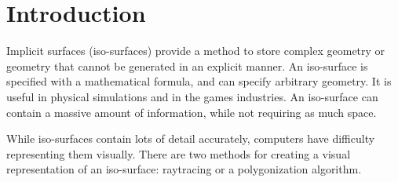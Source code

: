 \documentclass[conference]{acmsiggraph}
\title{\Title}
\author{
	\Author \\
	University of Victoria\\
	\Email}
\begin{document}


\maketitle

\begin{abstract}
	In this paper, I describe a method of implementing the marching
	triangles algorithm to polygonize implicit surfaces. The marching
	triangles algorithm provides a technique of generating optimal
	triangulations of a surface, while eliminating ambiguous cases found in
	other polygonization algorithms. The marching triangle algorithm, also
	known as the advancing front algorithm, grows the mesh from a seed
	triangle, until the surface is covered. This growth of single triangles
	allows the algorithm to generate a mesh that more closely represents
	the topology of the surface while minimizing polygons.
\end{abstract}

\keywordlist

\copyrightspace

\section{Introduction}
Implicit surfaces (iso-surfaces) provide a method to store complex geometry or
geometry that cannot be generated in an explicit manner. An iso-surface is
specified with a mathematical formula, and can specify arbitrary geometry. It
is useful in physical simulations and in the games industries. An iso-surface
can contain a massive amount of information, while not requiring as much space.

While iso-surfaces contain lots of detail accurately, computers have difficulty
representing them visually. There are two methods for creating a visual
representation of an iso-surface: raytracing or a polygonization algorithm.
\end{document}
